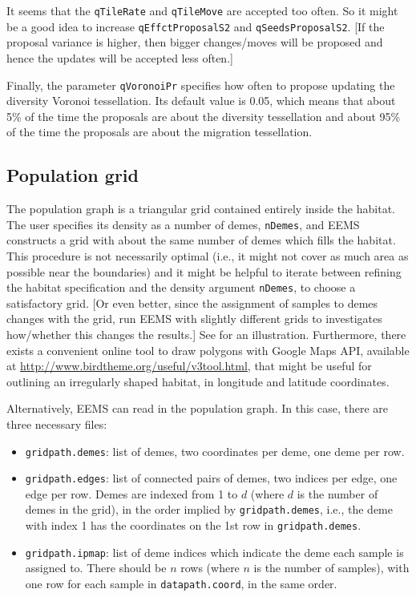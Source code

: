 \documentclass[a4paper,10pt,DIV=15,titlepage,mpinclude=true]{scrartcl}
\newcommand{\keystring}[1]{{\tt #1}}
\begin{document}
It seems that the \keystring{qTileRate} and \keystring{qTileMove} are accepted too often. So it might be a good idea to increase \keystring{qEffctProposalS2} and \keystring{qSeedsProposalS2}. [If the proposal variance is higher, then bigger changes/moves will be proposed and hence the updates will be accepted less often.]

Finally, the parameter \keystring{qVoronoiPr} specifies how often to propose updating the diversity Voronoi tessellation. Its default value is 0.05, which means that about 5\% of the time the proposals are about the diversity tessellation and about 95\% of the time the proposals are about the migration tessellation.

\subsection{Population grid}\label{sec:pop-grid}

The population graph is a triangular grid contained entirely inside the habitat. The user specifies its density as a number of demes, \keystring{nDemes}, and EEMS constructs a grid with about the same number of demes which fills the habitat. This procedure is not necessarily optimal (i.e., it might not cover as much area as possible near the boundaries) and it might be helpful to iterate between refining the habitat specification and the density argument \keystring{nDemes}, to choose a satisfactory grid. [Or even better, since the assignment of samples to demes changes with the grid, run EEMS with slightly different grids to investigates how/whether this changes the results.] See  for an illustration. Furthermore, there exists a convenient online tool to draw polygons with Google Maps API, available at \url{http://www.birdtheme.org/useful/v3tool.html}, that might be useful for outlining an irregularly shaped habitat, in longitude and latitude coordinates.

Alternatively, EEMS can read in the population graph. In this case, there are three necessary files:
\begin{itemize}
  \item \keystring{gridpath.demes}: list of demes, two coordinates per deme, one deme per row.
  \item \keystring{gridpath.edges}: list of connected pairs of demes, two indices per edge, one edge per row. Demes are indexed from 1 to $d$ (where $d$ is the number of demes in the grid), in the order implied by \keystring{gridpath.demes}, i.e., the deme with index 1 has the coordinates on the 1st row in \keystring{gridpath.demes}.
  \item \keystring{gridpath.ipmap}: list of deme indices which indicate the deme each sample is assigned to. There should be $n$ rows (where $n$ is the number of samples), with one row for each sample in \keystring{datapath.coord}, in the same order.
\end{itemize}
\end{document}
